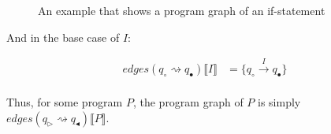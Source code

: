 \begin{figure}[htb!]
    \center
    
    \caption{An example that shows a program graph of an if-statement}
    \label{fig:non-deterministic-choice}
\end{figure}

And in the base case of $I$:

\begin{align}
    edges(q_\circ \rightsquigarrow q_\bullet) \llbracket I \rrbracket &= \{q_\circ \xrightarrow{I} q_\bullet\}\label{eq:equation11} \\
\end{align}

Thus, for some program $P$, the program graph of $P$ is simply $edges(q_\triangleright \rightsquigarrow q_\blacktriangleleft)\llbracket P \rrbracket$.
